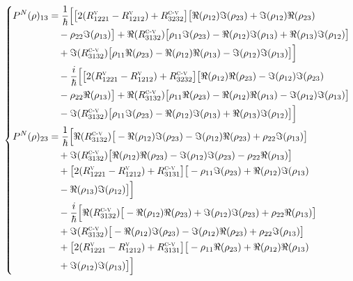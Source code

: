 \documentclass[12pt,a4paper,openany,oneside]{book}
\begin{document}
{{{{{{\begin{eqnarray*}
\left\{
\begin{split}
P^{N}(\rho)_{13}&= \dfrac{1}{\hbar}\Big[\big[2(R^{\textsc{v}}_{1221}-R^{\textsc{v}}_{1212})+R^{\textsc{c-v}}_{3232}\big]\big[\Re(\rho_{12})\Im(\rho_{23})+\Im(\rho_{12})\Re(\rho_{23})\\
&\quad -\rho_{22}\Im(\rho_{13})\big]+\Re(R^{\textsc{c-v}}_{3132})\big[\rho_{11}\Im(\rho_{23})-\Re(\rho_{12})\Im(\rho_{13})+\Re(\rho_{13})\Im(\rho_{12})\big]\\
&\quad + \Im(R^{\textsc{c-v}}_{3132})\big[\rho_{11}\Re(\rho_{23})-\Re(\rho_{12})\Re(\rho_{13})-\Im(\rho_{12})\Im(\rho_{13})\big]\Big]\\
 &\quad -\dfrac{i}{\hbar}\Big[\big[2(R^{\textsc{v}}_{1221}-R^{\textsc{v}}_{1212})+R^{\textsc{c-v}}_{3232}\big]\big[\Re(\rho_{12})\Re(\rho_{23})-\Im(\rho_{12})\Im(\rho_{23})\\
&\quad -\rho_{22}\Re(\rho_{13})\big]+ \Re(R^{\textsc{c-v}}_{3132})\big[\rho_{11}\Re(\rho_{23})-\Re(\rho_{12})\Re(\rho_{13})-\Im(\rho_{12})\Im(\rho_{13})\big]\\
&\quad -\Im(R^{\textsc{c-v}}_{3132})\big[\rho_{11}\Im(\rho_{23})-\Re(\rho_{12})\Im(\rho_{13})+\Re(\rho_{13})\Im(\rho_{12})\big]\Big]\\
P^{N}(\rho)_{23} &= \dfrac{1}{\hbar}\Big[\Re(R^{\textsc{c-v}}_{3132})\big[-\Re(\rho_{12})\Im(\rho_{23})-\Im(\rho_{12})\Re(\rho_{23})+\rho_{22}\Im(\rho_{13})\big]\\
&\quad +\Im(R^{\textsc{c-v}}_{3132})\big[\Re(\rho_{12})\Re(\rho_{23})-\Im(\rho_{12})\Im(\rho_{23})-\rho_{22}\Re(\rho_{13})\big]\\
&\quad +\big[2(R^{\textsc{v}}_{1221}-R^{\textsc{v}}_{1212})+R^{\textsc{c-v}}_{3131}\big]\big[-\rho_{11}\Im(\rho_{23})+\Re(\rho_{12})\Im(\rho_{13})\\
&\quad -\Re(\rho_{13})\Im(\rho_{12})\big] \Big]\\
&\quad -\dfrac{i}{\hbar}\Big[\Re(R^{\textsc{c-v}}_{3132})\big[-\Re(\rho_{12})\Re(\rho_{23})+\Im(\rho_{12})\Im(\rho_{23})+\rho_{22}\Re(\rho_{13})\big]\\
&\quad +\Im(R^{\textsc{c-v}}_{3132})\big[-\Re(\rho_{12})\Im(\rho_{23})-\Im(\rho_{12})\Re(\rho_{23})+\rho_{22}\Im(\rho_{13})\big]\\
&\quad +\big[2(R^{\textsc{v}}_{1221}-R^{\textsc{v}}_{1212})+R^{\textsc{c-v}}_{3131}\big]\big[-\rho_{11}\Re(\rho_{23})+\Re(\rho_{12})\Re(\rho_{13})\\
&\quad +\Im(\rho_{12})\Im(\rho_{13})\big]\Big]
\end{split}
\right.
\end{eqnarray*}

}}}}}}
\end{document}
